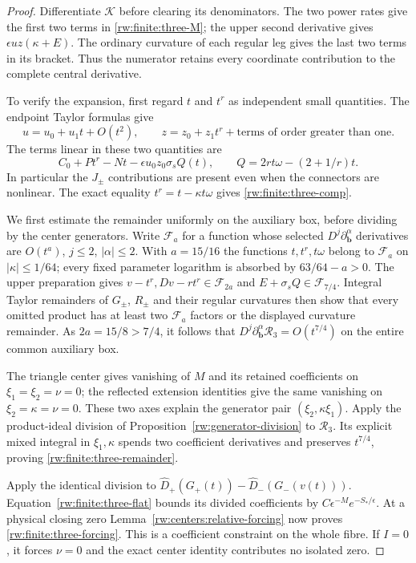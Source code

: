 \begin{proof}
Differentiate $\mathcal K$ before clearing its denominators.
The two power rates give the first two terms in
\eqref{rw:finite:three-M}; the upper second derivative gives
$\epsilon uz(\kappa+E)$. The ordinary curvature of each regular leg
gives the last two terms in its bracket. Thus the numerator retains
every coordinate contribution to the complete central derivative.

To verify the expansion, first regard $t$ and $t^r$ as independent
small quantities. The endpoint Taylor formulas give
\[
 u=u_0+u_1t+O(t^2),\qquad
 z=z_0+z_1t^r+\text{terms of order greater than one}.
\]
The terms linear in these two quantities are
\[
 C_0+Pt^r-Nt-\epsilon u_0z_0\sigma_s Q(t),
 \qquad Q=2rt\omega-(2+1/r)t.
\]
In particular the $J_\pm$ contributions are present even when the
connectors are nonlinear. The exact equality
$t^r=t-\kappa t\omega$ gives \eqref{rw:finite:three-comp}.

We first estimate the remainder uniformly on the auxiliary box,
before dividing by the center generators. Write $\mathcal F_a$ for a
function whose selected
$D^j\partial_{\mathbf b}^{\alpha}$ derivatives are $O(t^a)$,
$j\le2$, $|\alpha|\le2$. With $a=15/16$ the functions
$t,t^r,t\omega$ belong to $\mathcal F_a$ on
$|\kappa|\le1/64$; every fixed parameter logarithm is absorbed by
$63/64-a>0$. The upper preparation gives
$v-t^r,Dv-rt^r\in\mathcal F_{2a}$ and
$E+\sigma_sQ\in\mathcal F_{7/4}$.
Integral Taylor remainders of $G_\pm$, $R_\pm$ and their regular
curvatures then show that every omitted product has at least two
$\mathcal F_a$ factors or the displayed curvature remainder.
As $2a=15/8>7/4$, it follows that
$D^j\partial_{\mathbf b}^{\alpha}\mathcal R_3=O(t^{7/4})$ on
the entire common auxiliary box.

The triangle center gives vanishing of $M$ and its retained
coefficients on $\xi_1=\xi_2=\nu=0$; the reflected extension
identities give the same vanishing on $\xi_2=\kappa=\nu=0$.
These two axes explain the generator pair $(\xi_2,\kappa\xi_1)$.
Apply the product-ideal division of
Proposition~\ref{rw:generator-division} to $\mathcal R_3$.
Its explicit mixed integral in $\xi_1,\kappa$ spends two coefficient
derivatives and preserves $t^{7/4}$, proving
\eqref{rw:finite:three-remainder}.

Apply the identical division to
$\widehat D_+(G_+(t))-\widehat D_-(G_-(v(t)))$.
Equation~\eqref{rw:finite:three-flat} bounds its divided coefficients
by $C\epsilon^{-M}e^{-S_*/\epsilon}$. At a physical closing zero
Lemma~\ref{rw:centers:relative-forcing} now proves
\eqref{rw:finite:three-forcing}. This is a coefficient constraint
on the whole fibre. If $I=0$, it forces $\nu=0$ and the exact center
identity contributes no isolated zero.
\end{proof}

